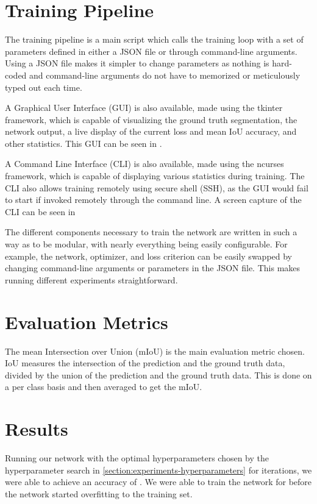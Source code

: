 

\section{Training Pipeline} \label{section:experiments-trainingpipeline}
The training pipeline is a main script which calls the training loop with a set of parameters defined in either a JSON file or through command-line arguments.
Using a JSON file makes it simpler to change parameters as nothing is hard-coded and command-line arguments do not have to memorized or meticulously typed out each time.

A Graphical User Interface (GUI) is also available, made using the tkinter framework, which is capable of visualizing the ground truth segmentation, the network output, a live display of the current loss and mean IoU accuracy, and other statistics.
This GUI can be seen in .

A Command Line Interface (CLI) is also available, made using the ncurses framework, which is capable of displaying various statistics during training.
The CLI also allows training remotely using secure shell (SSH), as the GUI would fail to start if invoked remotely through the command line.
A screen capture of the CLI can be seen in 



The different components necessary to train the network are written in such a way as to be modular, with nearly everything being easily configurable.
For example, the network, optimizer, and loss criterion can be easily swapped by changing command-line arguments or parameters in the JSON file.
This makes running different experiments straightforward.

\section{Evaluation Metrics} \label{section:experiments-evaluationmetrics}
The mean Intersection over Union (mIoU) is the main evaluation metric chosen.
IoU measures the intersection of the prediction and the ground truth data, divided by the union of the prediction and the ground truth data.
This is done on a per class basis and then averaged to get the mIoU.


\section{Results}\label{section:experiments-results}
Running our network with the optimal hyperparameters chosen by the hyperparameter search in \ref{section:experiments-hyperparameters} for  iterations, we were able to achieve an accuracy of .
We were able to train the network for  before the network started overfitting to the training set.


